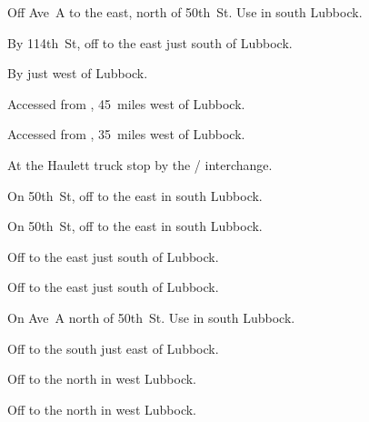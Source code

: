 

\begin{LocationList}

Off Ave~A to the east, north of 50th~St.
Use    in south Lubbock.

By 114th~St, off  to the east just south of Lubbock.

By  just west of Lubbock.

Accessed from , 45~miles west of Lubbock.

Accessed from , 35~miles west of Lubbock.

At the Haulett truck stop by the   /   interchange.

On 50th~St, off    to the east in south Lubbock.

On 50th~St, off    to the east in south Lubbock.

Off  to the east just south of Lubbock.

Off  to the east just south of Lubbock.

On Ave~A north of 50th~St.
Use    in south Lubbock.

Off  to the south just east of Lubbock.

Off  to the north in west Lubbock.

Off  to the north in west Lubbock.

\end{LocationList}
